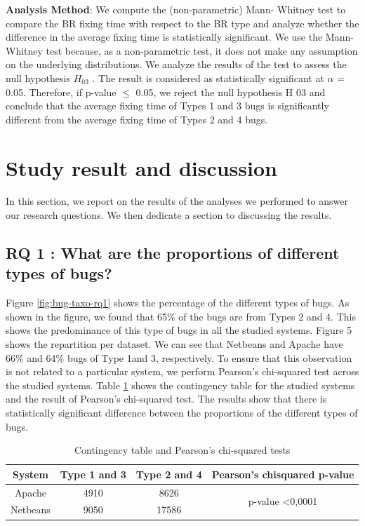 {\bf Analysis Method}: We compute the (non-parametric) Mann-
Whitney test to compare the BR fixing time with respect to
the BR type and analyze whether the difference in the average
fixing time is statistically significant. We use the Mann-
Whitney test because, as a non-parametric test, it does not
make any assumption on the underlying distributions. We
analyze the results of the test to assess the null hypothesis
$H_{03}$ . The result is considered as statistically significant at $\alpha$ =
0.05. Therefore, if p-value $\le$ 0.05, we reject the null
hypothesis H 03 and conclude that the average fixing time of
Types 1 and 3 bugs is significantly different from the average
fixing time of Types 2 and 4 bugs.

\section{Study result and discussion}

In this section, we report on the results of the analyses we
performed to answer our research questions. We then dedicate
a section to discussing the results.

\subsection{RQ 1 : What are the proportions of different types of
bugs?}

Figure \ref{fig:bug-taxo-rq1} shows the percentage of the different types of
bugs. As shown in the figure, we found that 65\% of the bugs
are from Types 2 and 4. This shows the predominance of this
type of bugs in all the studied systems. Figure 5 shows the
repartition per dataset. We can see that Netbeans and Apache
have 66\% and 64\% bugs of Type 1and 3, respectively. To
ensure that this observation is not related to a particular
system, we perform Pearson’s chi-squared test across the
studied systems. Table \ref{tab:bug-taxo-rq1} shows the contingency table for the
studied systems and the result of Pearson’s chi-squared test.
The results show that there is statistically significant
difference between the proportions of the different types of
bugs.

\begin{table}[h!]
\centering
\begin{tabular}{c|c|c|c}
{System} & {Type 1 and 3} & {Type 2 and 4} & {Pearson’s chisquared p-value}        \\  \hline \hline
Apache       & 4910               & 8626               & \multirow{2}{*}{p-value \textless 0,0001} \\ \cline{1-3}
Netbeans     & 9050               & 17586              & \\ \hline \hline
\end{tabular}
\caption{Contingency table and Pearson's chi-squared tests\label{tab:bug-taxo-rq1}}
\end{table}

